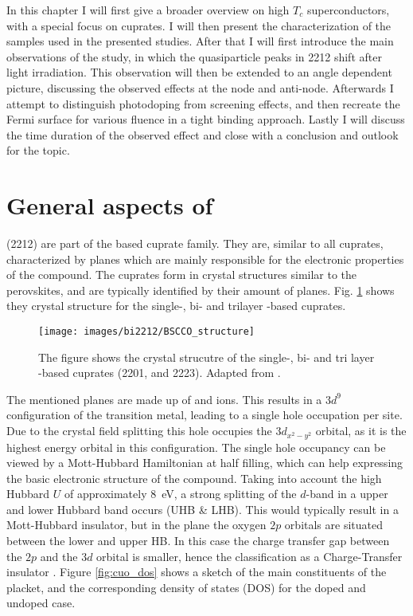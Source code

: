 In this chapter I will first give a broader overview on high $T_c$ superconductors, with a special focus on cuprates.
I will then present the  characterization of the samples used in the presented studies.
After that I will first introduce the main observations of the study, in which the quasiparticle peaks in 2212 shift after light irradiation.
This observation will then be extended to an angle dependent picture, discussing the observed effects at the node and anti-node.
Afterwards I attempt to distinguish photodoping from screening effects, and then recreate the Fermi surface for various fluence in a tight binding approach.
Lastly I will discuss the time duration of the observed effect and close with a conclusion and outlook for the topic.

\section{General aspects of }
\label{sec:bscco_general}

 (2212) are part of the  based cuprate family.
They are, similar to all cuprates, characterized by  planes which are mainly responsible for the electronic properties of the compound.
The cuprates form in crystal structures similar to the perovskites, and are typically identified by their amount of  planes.
Fig. \ref{fig:bscco_structure} shows they crystal structure for the single-, bi- and trilayer -based cuprates.

\begin{figure}
	\centering
	\texttt{[image: images/bi2212/BSCCO\_structure]}
	\caption{The figure shows the crystal strucutre of the single-, bi- and tri layer -based cuprates  (2201,  and 2223). Adapted from \cite{nazargulov_english_2009}.}
	\label{fig:bscco_structure}
\end{figure}


The mentioned  planes are made up of  and  ions.
This results in a $3d^9$ configuration of the transition metal, leading to a single hole occupation per site.
Due to the crystal field splitting this hole occupies the $3d_{x^2-y^2}$ orbital, as it is the highest energy orbital in this configuration.
The single hole occupancy can be viewed by a Mott-Hubbard Hamiltonian at half filling, which can help expressing the basic electronic structure of the compound.
Taking into account the high Hubbard $U$ of approximately \qty{8}{\electronvolt}, a strong splitting of the $d$-band in a upper and lower Hubbard band occurs (UHB \& LHB).
This would typically result in a Mott-Hubbard insulator, but in the  plane the oxygen $2p$ orbitals are situated between the lower and upper HB.
In this case the charge transfer gap between the  $2p$ and the  $3d$ orbital is smaller, hence the classification as a Charge-Transfer insulator \cite{zaanen_band_1985,zegrodnik_superconductivity_2019}. 
Figure \ref{fig:cuo_dos} shows a sketch of the main constituents of the  placket, and the corresponding density of states (DOS) for the doped and undoped case.

